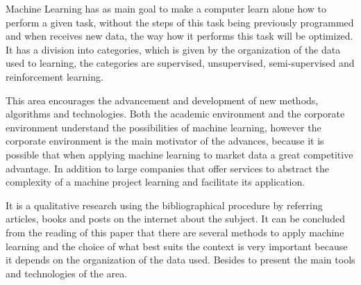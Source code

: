 Machine Learning has as main goal to make a 
computer learn alone how to perform a given task, without the steps of this task being previously programmed
and when receives new data, the way how it performs this task will be optimized. 
It has a division into categories, which is given by the organization of the data used to learning, the categories are
supervised, unsupervised, semi-supervised and reinforcement learning. 


This area encourages the advancement and development of new methods, algorithms and technologies. Both the academic environment 
and the corporate environment understand the possibilities of machine learning, however the corporate environment is 
the main motivator of the advances, because it is possible that when applying machine learning to market data a 
great competitive advantage. In addition to large companies that offer services to abstract the complexity of a 
machine project learning and facilitate its application.


It is a qualitative research using the bibliographical procedure by referring articles, books and posts on the internet
about the subject. It can be concluded from the reading of this paper that there are several
methods to apply machine learning and the choice of what best suits the context is very important because it depends on the 
organization of the data used. Besides to present the main tools and technologies of the area.

